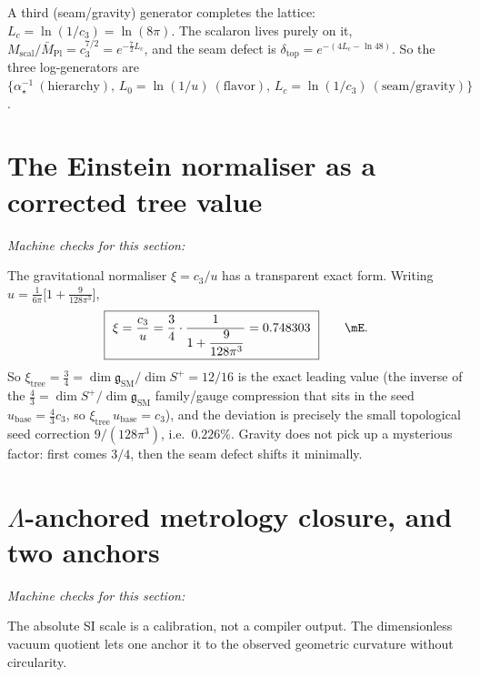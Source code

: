 \documentclass[11pt,a4paper]{article}
\newcommand{\Mbar}{\bar M_{\mathrm{Pl}}}
\newcommand{\cthree}{c_3}
\newcommand{\useed}{u}
\newcommand{\dtop}{\delta_{\mathrm{top}}}
\newcommand{\ainv}{\alpha^{-1}_\star}
\newcommand{\dimg}{\dim\mathfrak g_{\mathrm{SM}}}
\theoremstyle{definition}
\begin{document}
\noindent A third (seam/gravity) generator completes the lattice: $L_c=\ln(1/\cthree)=\ln(8\pi)$.
The scalaron lives purely on it, $M_{\mathrm{scal}}/\Mbar=\cthree^{7/2}=e^{-\frac72 L_c}$, and the seam
defect is $\dtop=e^{-(4L_c-\ln48)}$. So the three log-generators are $\{\ainv\ (\text{hierarchy}),\,
L_0=\ln(1/\useed)\ (\text{flavor}),\,L_c=\ln(1/\cthree)\ (\text{seam/gravity})\}$. \mE

\section{The Einstein normaliser as a corrected tree value}
\noindent\emph{Machine checks for this section:} 


The gravitational normaliser $\xi=\cthree/\useed$ has a transparent exact form. Writing
$\useed=\tfrac{1}{6\pi}\bigl[1+\tfrac{9}{128\pi^3}\bigr]$,
\begin{equation}
  \boxed{\ \xi=\frac{\cthree}{\useed}=\frac34\cdot\frac{1}{1+\dfrac{9}{128\pi^3}}=0.748303\ }\qquad\mE .
\end{equation}
So $\xi_{\mathrm{tree}}=\tfrac34=\dimg/\dim S^+=12/16$ is the exact leading value (the inverse of the
$\tfrac43=\dim S^+/\dimg$ family/gauge compression that sits in the seed $u_{\mathrm{base}}=\tfrac43\cthree$,
so $\xi_{\mathrm{tree}}\,u_{\mathrm{base}}=\cthree$), and the
deviation is precisely the small topological seed correction $9/(128\pi^3)$, i.e.\ $0.226\%$.
Gravity does not pick up a mysterious factor: first comes $3/4$, then the seam defect shifts it
minimally.

\section{$\Lambda$-anchored metrology closure, and two anchors}
\noindent\emph{Machine checks for this section:} 


The absolute SI scale is a calibration, not a compiler output. The dimensionless vacuum quotient lets one
anchor it to the observed geometric curvature without circularity.
\end{document}
